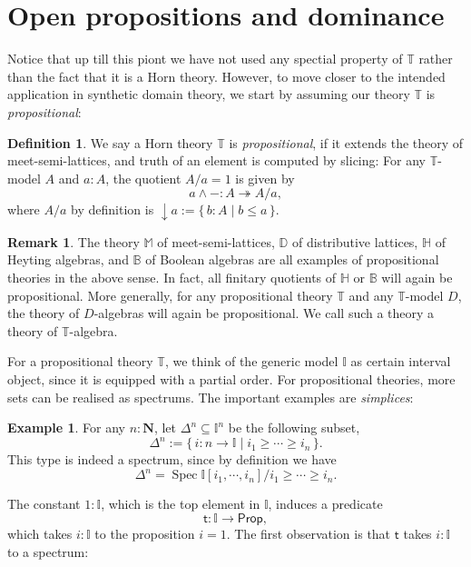 \documentclass[12pt]{amsart}
\theoremstyle{definition}
\newtheorem{example}[theorem]{Example}
\newtheorem{definition}[theorem]{Definition}
\newtheorem{remark}[theorem]{Remark}
\newcommand{\mb}[1]{\mathbf{#1}}
\newcommand{\mbb}[1]{\mathbb{#1}}
\newcommand{\T}{\mbb T}
\newcommand{\I}{\mbb I}
\newcommand{\ms}[1]{\mathsf{#1}}
\newcommand{\scomp}[2]{\{\,#1\mid#2\,\}}
\newcommand{\surj}{\twoheadrightarrow}
\newcommand{\cv}{\operatorname{\downarrow}}
\newcommand{\N}{\mb N}
\newcommand{\pp}{\ms{Prop}}
\newcommand{\spec}{\operatorname{Spec}}
\begin{document}
\section{Open propositions and dominance}\label{sec:dominance}

Notice that up till this piont we have not used any spectial property of $\T$ rather than the fact that it is a Horn theory. However, to move closer to the intended application in synthetic domain theory, we start by assuming our theory $\T$ is \emph{propositional}: 

\begin{definition}
  We say a Horn theory $\T$ is \emph{propositional}, if it extends the theory of meet-semi-lattices, and truth of an element is computed by slicing: For any $\T$-model $A$ and $a:A$, the quotient $A/a=1$ is given by
  \[ a \wedge - : A \surj A/a, \]
  where $A/a$ by definition is $\cv a := \scomp{b:A}{b\le a}$.
\end{definition}

\begin{remark}
  The theory $\mbb M$ of meet-semi-lattices, $\mbb D$ of distributive lattices, $\mbb H$ of Heyting algebras, and $\mbb B$ of Boolean algebras are all examples of propositional theories in the above sense. In fact, all finitary quotients of $\mbb H$ or $\mbb B$ will again be propositional. More generally, for any propositional theory $\T$ and any $\T$-model $D$, the theory of $D$-algebras will again be propositional. We call such a theory a theory of $\T$-algebra.
\end{remark}

For a propositional theory $\T$, we think of the generic model $\I$ as certain interval object, since it is equipped with a partial order. For propositional theories, more sets can be realised as spectrums. The important examples are \emph{simplices}:

\begin{example}\label{exm:simplicesaffine}
  For any $n : \N$, let $\Delta^n \subseteq \I^n$ be the following subset,
  \[ \Delta^n := \scomp{i : n \to \I}{i_1 \ge \cdots \ge i_n}. \]
  This type is indeed a spectrum, since by definition we have
  \[ \Delta^n = \spec\I[i_1,\cdots,i_n]/i_1\ge\cdots\ge i_n. \]
\end{example}

The constant $1 : \I$, which is the top element in $\I$, induces a predicate
\[ \ms t : \I \to \pp, \]
which takes $i : \I$ to the proposition $i = 1$. The first observation is that $\ms t$ takes $i : \I$ to a spectrum:
\end{document}
